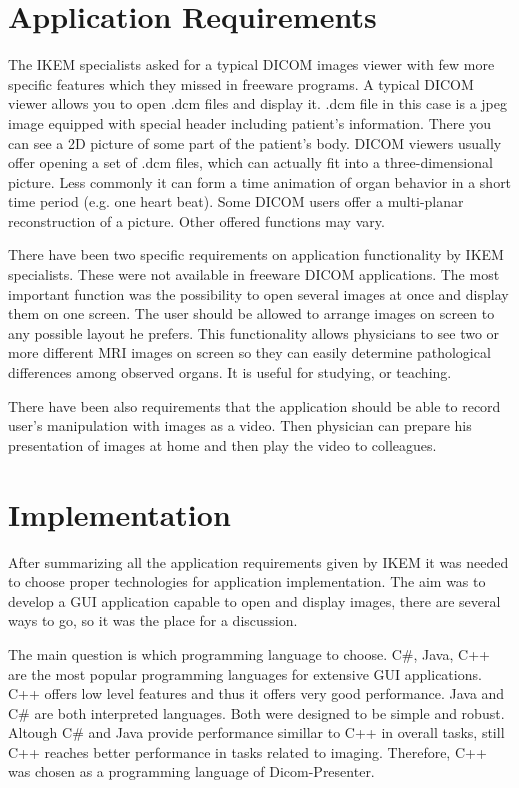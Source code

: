 \section{Application Requirements}
\label{requirements}
The IKEM specialists asked for a typical DICOM images viewer with few more specific features which they missed in freeware programs. A typical DICOM viewer allows you to open .dcm files and display it. .dcm file in this case is a jpeg image equipped with special header including patient's information. There you can see a 2D picture of some part of the patient's body. DICOM viewers usually offer opening a set of .dcm files, which can actually fit into a three-dimensional picture. Less commonly it can form a time animation of organ behavior in a short time period (e.g. one heart beat). Some DICOM users offer a multi-planar reconstruction of a picture. Other offered functions may vary.

There have been two specific requirements on application functionality by IKEM specialists. These were not available in freeware DICOM applications. The most important function was the possibility to open several images at once and display them on one screen. The user should be allowed to arrange images on screen to any possible layout he prefers. This functionality allows physicians to see two or more different MRI images on screen so they can easily determine pathological differences among observed organs. It is useful for studying, or teaching.

There have been also requirements that the application should be able to record user's manipulation with images as a video. Then physician can prepare his presentation of images at home and then play the video to colleagues.

\section{Implementation}
After summarizing all the application requirements given by IKEM it was needed to choose proper technologies for application implementation. The aim was to develop a GUI application capable to open and display images, there are several ways to go, so it was the place for a discussion. 

The main question is which programming language to choose. C\#, Java, C++ are the most popular programming languages for extensive GUI applications. C++ offers low level features and thus it offers very good performance. Java and C\# are both interpreted languages. Both were designed to be simple and robust. Altough C\# and Java provide performance simillar to C++ in overall tasks, still C++ reaches better performance in tasks related to imaging. Therefore, C++ was chosen as a programming language of Dicom-Presenter.

